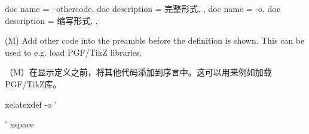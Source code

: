 \begin{docKeys}[
    doc no index,   %
    doc parameter = {~\meta{code}},
    ]
    {
    {
        doc name        = --othercode,
        doc description = 完整形式,
    },
    {
        doc name        = -o,
        doc description = 缩写形式,
    },
    }

(M) Add other code into the preamble before the definition is shown.
This can be used to e.g. load PGF/TikZ libraries.

（M）在显示定义之前，将其他代码添加到序言中。这可以用来例如加载PGF/TikZ库。    
\begin{commandshell} 
xelatexdef -o '\usepackage{xspace}' xspace
\end{commandshell}  
\end{docKeys}

